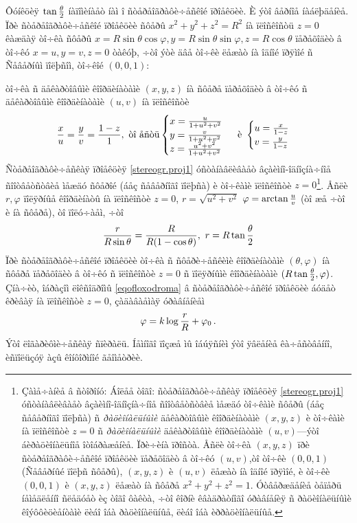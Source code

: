 \documentclass[12pt,a4paper]{amsart}
\begin{document}
  Ôóíêöèÿ $\tan {\theta\over 2}$ íàïîìèíàåò íàì î ñòåðåîãðàôè÷åñêîé ïðîåêöèè. È ýòî âåðíîå íàáëþäåíèå.
    Ïðè ñòåðåîãðàôè÷åñêîé ïðîåêöèè ñôåðû  $x^2+y^2+z^2=R^2$ íà ïëîñêîñòü $z=0$ êàæäàÿ òî÷êà ñôåðû
   $x=R\sin\theta\cos\varphi, y=R\sin\theta\sin\varphi, z=R\cos\theta$ ïåðåõîäèò
   â òî÷êó $x=u,y=v,z=0$ òàêóþ, ÷òî ýòè äâå òî÷êè ëåæàò íà îäíîé ïðÿìîé ñ Ñåâåðíûì ïîëþñîì, òî÷êîé $(0,0,1)$:
    {òî÷êà ñ äåêàðòîâûìè êîîðäèíàòàìè $(x,y,z)$ íà ñôåðå ïåðåõîäèò â òî÷êó ñ äåêàðòîâûìè êîîðäèíàòàìè
   $(u,v)$ íà ïëîñêîñòè
            \begin{equation}\label{stereogr.proj1}
    {x\over u}={y\over v}={1-z\over 1},\,\, \hbox{òî åñòü}
    \begin{cases}x={u\over 1+u^2+v^2}\\
                 y={v\over 1+u^2+v^2}\\
                 z={u^2+v^2\over 1+u^2+v^2}\end{cases}\,\,
                 \hbox{è}\,\,
\begin{cases}u={x\over 1-z}\\
v={y\over 1-z}\end{cases}
\end{equation}
Ñòåðåîãðàôè÷åñêàÿ ïðîåêöèÿ \eqref{stereogr.proj1} óñòàíàâëèâàåò âçàèìíî-îäíîçíà÷íîå ñîîòâåòñòâèå  ìåæäó ñôåðîé (áåç ñåâåðíîãî ïîëþñà) è
   òî÷êàìè ïëîñêîñòè $z=0$\footnote{Çàìå÷àíèå â ñòîðîíó:  Áîëåå òîãî: ñòåðåîãðàôè÷åñêàÿ ïðîåêöèÿ \eqref{stereogr.proj1}
   óñòàíàâëèâàåò âçàèìíî-îäíîçíà÷íîå ñîîòâåòñòâèå  ìåæäó òî÷êàìè ñôåðû (áåç ñåâåðíîãî ïîëþñà)
   ñ {\it ðàöèîíàëüíûìè }äåêàðòîâûìè êîîðäèíàòàìè $(x,y,z)$  è
   òî÷êàìè íà ïëîñêîñòè $z=0$ ñ {\it ðàöèîíàëüíûìè }äåêàðòîâûìè êîîðäèíàòàìè
   $(u,v)$---ýòî áèðàöèîíàëüíîå îòîáðàæåíèå. Ïðè÷èíà ïðîñòà. Åñëè òî÷êà $(x,y,z)$ ïðè ñòåðåîãðàôè÷åñêîé ïðîåêöèè
   ïåðåõîäèò â òî÷êó $(u,v)$,òî òî÷êè $(0,0,1)$
     (Ñåâåðíûé ïîëþñ ñôåðû),  $(x,y,z)$  è $(u,v)$ ëåæàò íà îäíîé ïðÿìîé, è
     òî÷êè $(0,0,1)$ è  $(x,y,z)$  ëåæàò íà ñôåðå $x^2+y^2+z^2=1$.
     Óòâåðæäåíèå òåïåðü íåìåäëåííî ñëåäóåò èç òîãî ôàêòà, ÷òî
     êîðíè êâàäðàòíîãî óðàâíåíèÿ ñ ðàöèîíàëüíûìè êîýôôèöèåíòàìè ëèáî îáà ðàöèîíàëüíûå, ëèáî îáà èððàöèîíàëüíûå.}.
 Åñëè $r,\varphi$ ïîëÿðíûå êîîðäèíàòû íà ïëîñêîñòè $z=0$, $r=\sqrt {u^2+v^2}$ $\varphi=\arctan {u\over v}$
 (òî æå ÷òî è íà ñôåðå), òî ïîëó÷àåì, ÷òî
                 \begin{equation}\label{stereogr,proj2}
                    {r\over R\sin\theta}={R\over R(1-\cos \theta)},\,\, r=R\tan{\theta\over 2}
                 \end{equation}
  Ïðè ñòåðåîãðàôè÷åñêîé ïðîåêöèè òî÷êà ñ ñôåðè÷åñêèìè êîîðäèíàòàìè $(\theta,\varphi)$ íà ñôåðå
  ïåðåõîäèò â òî÷êó ñ ïëîñêîñòè $z=0$ ñ ïîëÿðíûìè êîîðäèíàòàìè $(R\tan{\theta\over 2},\varphi)$.
  Çíà÷èò, îáðàçîì ëîêñîäðîìû \eqref{eqofloxodroma} â ñòåðåîãðàôè÷åñêîé ïðîåêöèè
  áóäåò êðèâàÿ íà ïëîñêîñòè $z=0$, çàäàâàåìàÿ óðàâíåíèåì
                                  \begin{equation}\label{obrazloksodromy}
                                    \varphi=k\log {r\over R}+\varphi_0\,.
                                  \end{equation}
   Ýòî ëîãàðèôìè÷åñêàÿ ñïèðàëü. Íåìíîãî ïîçæå ìû îáúÿñíèì ýòî
   ÿâëåíèå êà÷åñòâåííî, èñïîëüçóÿ àçû êîíôîðìíîé ãåîìåòðèè.

}
\end{document}
